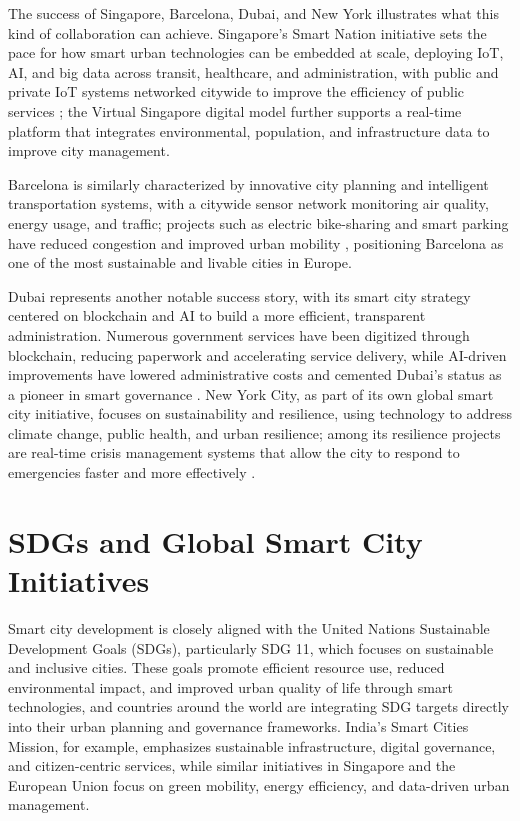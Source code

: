 \documentclass[journal]{IEEEtran}
\begin{document}
The success of Singapore, Barcelona, Dubai, and New York illustrates what this kind of collaboration can achieve. Singapore's Smart Nation initiative sets the pace for how smart urban technologies can be embedded at scale, deploying IoT, AI, and big data across transit, healthcare, and administration, with public and private IoT systems networked citywide to improve the efficiency of public services \cite{r87,r110}; the Virtual Singapore digital model further supports a real-time platform that integrates environmental, population, and infrastructure data to improve city management.

Barcelona is similarly characterized by innovative city planning and intelligent transportation systems, with a citywide sensor network monitoring air quality, energy usage, and traffic; projects such as electric bike-sharing and smart parking have reduced congestion and improved urban mobility \cite{r88,r111,r35}, positioning Barcelona as one of the most sustainable and livable cities in Europe.

Dubai represents another notable success story, with its smart city strategy centered on blockchain and AI to build a more efficient, transparent administration. Numerous government services have been digitized through blockchain, reducing paperwork and accelerating service delivery, while AI-driven improvements have lowered administrative costs and cemented Dubai's status as a pioneer in smart governance \cite{r89,r112}. New York City, as part of its own global smart city initiative, focuses on sustainability and resilience, using technology to address climate change, public health, and urban resilience; among its resilience projects are real-time crisis management systems that allow the city to respond to emergencies faster and more effectively \cite{r90,r113}.

\section{SDGs and Global Smart City Initiatives}
Smart city development is closely aligned with the United Nations Sustainable Development Goals (SDGs), particularly SDG 11, which focuses on sustainable and inclusive cities. These goals promote efficient resource use, reduced environmental impact, and improved urban quality of life through smart technologies, and countries around the world are integrating SDG targets directly into their urban planning and governance frameworks. India's Smart Cities Mission, for example, emphasizes sustainable infrastructure, digital governance, and citizen-centric services, while similar initiatives in Singapore and the European Union focus on green mobility, energy efficiency, and data-driven urban management.
\end{document}
